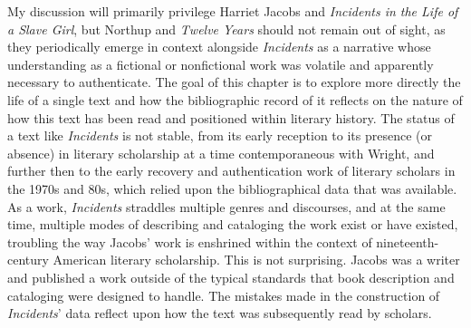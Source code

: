 My discussion will primarily privilege Harriet Jacobs and \textit{Incidents in the Life of a Slave Girl}, but Northup and \textit{Twelve Years} should not remain out of sight, as they periodically emerge in context alongside \textit{Incidents} as a narrative whose understanding as a fictional or nonfictional work was volatile and apparently necessary to authenticate. The goal of this chapter is to explore more directly the life of a single text and how the bibliographic record of it reflects on the nature of how this text has been read and positioned within literary history. The status of a text like \textit{Incidents} is not stable, from its early reception to its presence (or absence) in literary scholarship at a time contemporaneous with Wright, and further then to the early recovery and authentication work of literary scholars in the 1970s and 80s, which relied upon the bibliographical data that was available. As a work, \textit{Incidents} straddles multiple genres and discourses, and at the same time, multiple modes of describing and cataloging the work exist or have existed, troubling the way Jacobs' work is enshrined within the context of nineteenth-century American literary scholarship. This is not surprising. Jacobs was a writer and published a work outside of the typical standards that book description and cataloging were designed to handle. The mistakes made in the construction of \textit{Incidents}' data reflect upon how the text was subsequently read by scholars. 

